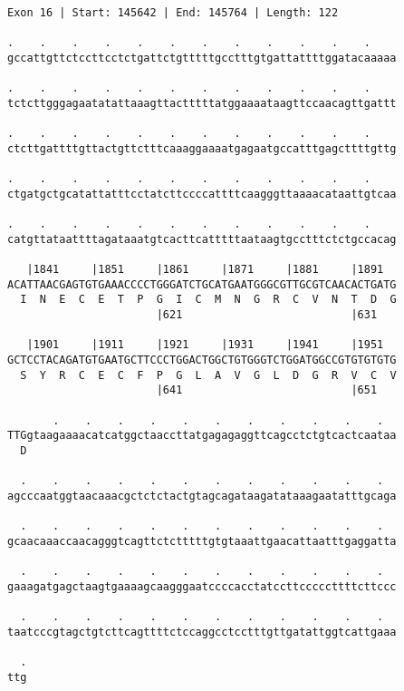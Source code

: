 \documentclass{article}
\begin{document}
\begin{Verbatim}[fontfamily=courier]
Exon 16 | Start: 145642 | End: 145764 | Length: 122

.    .    .    .    .    .    .    .    .    .    .    .    
gccattgttctccttcctctgattctgtttttgcctttgtgattattttggatacaaaaa

.    .    .    .    .    .    .    .    .    .    .    .    
tctcttgggagaatatattaaagttactttttatggaaaataagttccaacagttgattt

.    .    .    .    .    .    .    .    .    .    .    .    
ctcttgattttgttactgttctttcaaaggaaaatgagaatgccatttgagcttttgttg

.    .    .    .    .    .    .    .    .    .    .    .    
ctgatgctgcatattatttcctatcttccccattttcaagggttaaaacataattgtcaa

.    .    .    .    .    .    .    .    .    .    .    .    
catgttataattttagataaatgtcacttcatttttaataagtgcctttctctgccacag

   |1841     |1851     |1861     |1871     |1881     |1891  
ACATTAACGAGTGTGAAACCCCTGGGATCTGCATGAATGGGCGTTGCGTCAACACTGATG
  I  N  E  C  E  T  P  G  I  C  M  N  G  R  C  V  N  T  D  G
                       |621                          |631   

   |1901     |1911     |1921     |1931     |1941     |1951  
GCTCCTACAGATGTGAATGCTTCCCTGGACTGGCTGTGGGTCTGGATGGCCGTGTGTGTG
  S  Y  R  C  E  C  F  P  G  L  A  V  G  L  D  G  R  V  C  V
                       |641                          |651   

       .    .    .    .    .    .    .    .    .    .    .  
TTGgtaagaaaacatcatggctaaccttatgagagaggttcagcctctgtcactcaataa
  D                                                         

  .    .    .    .    .    .    .    .    .    .    .    .  
agcccaatggtaacaaacgctctctactgtagcagataagatataaagaatatttgcaga

  .    .    .    .    .    .    .    .    .    .    .    .  
gcaacaaaccaacagggtcagttctctttttgtgtaaattgaacattaatttgaggatta

  .    .    .    .    .    .    .    .    .    .    .    .  
gaaagatgagctaagtgaaaagcaagggaatccccacctatccttcccccttttcttccc

  .    .    .    .    .    .    .    .    .    .    .    .  
taatcccgtagctgtcttcagttttctccaggcctcctttgttgatattggtcattgaaa

  .
ttg
\end{Verbatim}
\newpage
\end{document}
